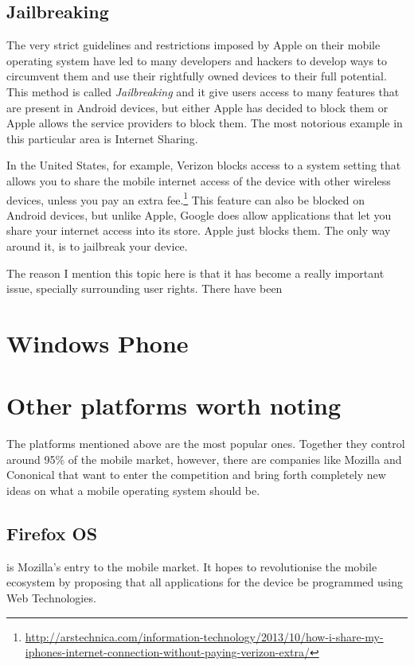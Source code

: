 \subsection{Jailbreaking}
The very strict guidelines and restrictions imposed by Apple on their mobile operating system have led to many developers and hackers to develop ways to circumvent them and use their rightfully owned devices to their full potential. This method is called \emph{Jailbreaking}  and it give users access to many features that are present in Android devices, but either Apple has decided to block them or Apple allows the service providers to block them. The most notorious example in this particular area is Internet Sharing. 


In the United States, for example, Verizon blocks access to a system setting that allows you to share the mobile internet access of the device with other wireless devices, unless you pay an extra fee.\footnote{\url{http://arstechnica.com/information-technology/2013/10/how-i-share-my-iphones-internet-connection-without-paying-verizon-extra/}} This feature can also be blocked on Android devices, but unlike Apple, Google does allow applications that let you share your internet access into its store. Apple just blocks them. The only way around it, is to jailbreak your device.

The reason I mention this topic here is that it has become a really important issue, specially surrounding user rights. There have been     

\section{Windows Phone}
\section{Other platforms worth noting}
The platforms mentioned above are the most popular ones. Together they control around 95\% of the mobile market, however, there are companies like Mozilla and Cononical that want to enter the competition and bring forth completely new ideas on what a mobile operating system should be.

\subsection{Firefox OS}
 is Mozilla's entry to the mobile market. It hopes to revolutionise the mobile ecosystem by proposing that all applications for the device be programmed using Web Technologies.


